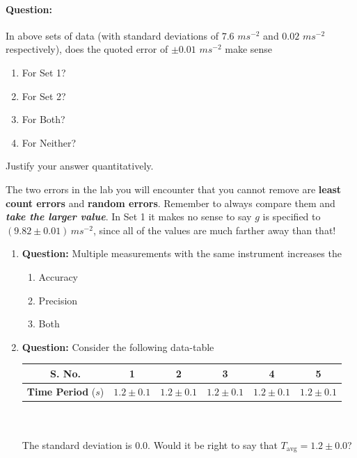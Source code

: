 \begin{question}
\paragraph{Question:} In above sets of data (with standard deviations of $7.6\,\,ms^{-2}$ and $0.02\,\,ms^{-2}$ respectively), does the quoted error of $\pm 0.01\,\, ms^{-2}$ make sense
\begin{enumerate}
    \item For Set 1?
    \item For Set 2?
    \item For Both?
    \item For Neither?
\end{enumerate}
Justify your answer quantitatively.
\end{question}

\begin{imp}
The two errors in the lab you will encounter that you cannot remove are \textbf{least count errors} and \textbf{random errors}. Remember to always compare them and \textbf{\textit{take the larger value}}. In Set 1 it makes no sense to say $g$ is specified to $(9.82\pm0.01)\,ms^{-2}$, since all of the values are much farther away than that!
\end{imp}

\begin{question}
\begin{enumerate}
    \item \textbf{Question:} Multiple measurements with the same instrument increases the
    \begin{enumerate}
        \item Accuracy
        \item Precision
        \item Both
    \end{enumerate}
    
    \item \textbf{Question:} Consider the following data-table~\\
    \begin{tabular}{cccccc}
    \hline
    \textbf{S. No.}&1&2&3&4&5\\
    \hline
    \textbf{Time Period} ($s$)& $1.2\pm0.1$&$1.2\pm0.1$&$1.2\pm0.1$&$1.2\pm0.1$&$1.2\pm0.1$\\
    \hline
    \end{tabular}~\\~\\
    The standard deviation is $0.0$. Would it be right to say that $T_\text{avg} = 1.2\pm 0.0$?
\end{enumerate}
\end{question}

